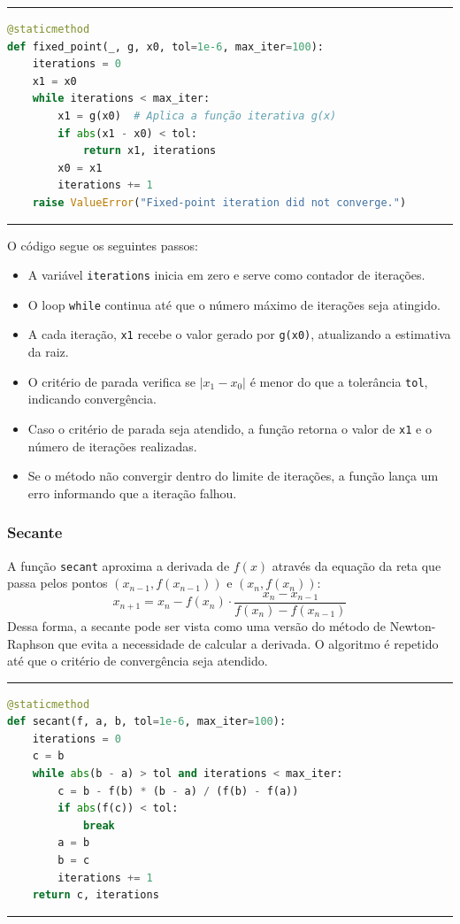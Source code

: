 \hrule
\lstset{style=mystyle}
\begin{lstlisting}[language=Python]
@staticmethod
def fixed_point(_, g, x0, tol=1e-6, max_iter=100):
    iterations = 0
    x1 = x0
    while iterations < max_iter:
        x1 = g(x0)  # Aplica a função iterativa g(x)
        if abs(x1 - x0) < tol:
            return x1, iterations
        x0 = x1
        iterations += 1
    raise ValueError("Fixed-point iteration did not converge.")
\end{lstlisting}
\hrule

O código segue os seguintes passos:
\begin{itemize}
	\item A variável \texttt{iterations} inicia em zero e serve como contador de
	      iterações.
	\item O loop \texttt{while} continua até que o número máximo de iterações
	      seja atingido.
	\item A cada iteração, \texttt{x1} recebe o valor gerado por \texttt{g(x0)},
	      atualizando a estimativa da raiz.
	\item O critério de parada verifica se \( |x_1 - x_0| \) é menor do que a
	      tolerância \texttt{tol}, indicando convergência.
	\item Caso o critério de parada seja atendido, a função retorna o valor de
	      \texttt{x1} e o número de iterações realizadas.
	\item Se o método não convergir dentro do limite de iterações, a função
	      lança um erro informando que a iteração falhou.
\end{itemize}

\subsubsection{Secante}

A função \texttt{secant} aproxima a derivada de \( f(x) \) através da equação da
reta que passa pelos pontos \( (x_{n-1}, f(x_{n-1})) \) e \( (x_n, f(x_n)) \):
\[
	x_{n+1} = x_n - f(x_n) \cdot \frac{x_n - x_{n-1}}{f(x_n) - f(x_{n-1})}
\]
Dessa forma, a secante pode ser vista como uma versão do método de
Newton-Raphson que evita a necessidade de calcular a derivada. O algoritmo é
repetido até que o critério de convergência seja atendido.

\hrule
\lstset{style=mystyle}
\begin{lstlisting}[language=Python]
@staticmethod
def secant(f, a, b, tol=1e-6, max_iter=100):
    iterations = 0
    c = b
    while abs(b - a) > tol and iterations < max_iter:
        c = b - f(b) * (b - a) / (f(b) - f(a))
        if abs(f(c)) < tol:
            break
        a = b
        b = c
        iterations += 1
    return c, iterations
\end{lstlisting}
\hrule

